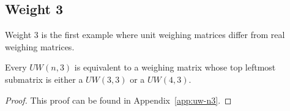 \subsection{Weight 3}
\label{subsec:w3}

Weight 3 is the first example where unit weighing matrices differ from real weighing matrices.

\begin{lemma} \label{lem:uw-n3}
 Every $UW(n,3)$ is equivalent to a weighing matrix whose top leftmost submatrix is either a $UW(3,3)$ or a $UW(4,3)$.

\begin{proof}
 This proof can be found in Appendix~\ref{app:uw-n3}.
\end{proof}

\end{lemma}


